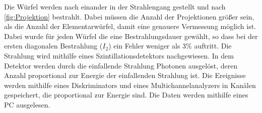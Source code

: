 Die Würfel werden nach einander in der Strahlengang gestellt und nach \cref{fig:Projektion} bestrahlt.
Dabei müssen die Anzahl der Projektionen größer sein, als die Anzahl der Elementarwürfel, damit eine genauere Vermessung möglich ist.\\
Dabei wurde für jeden Würfel die eine Bestrahlungsdauer gewählt, so dass bei der ersten diagonalen Bestrahlung ($I_2$) ein Fehler weniger als $3\%$ auftritt.
Die Strahlung wird mithilfe eines Szintillationsdetektors nachgewiesen.
In dem Detektor werden durch die einfallende Strahlung Photonen ausgelöst, deren Anzahl proportional zur Energie der einfallenden Strahlung ist.
Die Ereignisse werden mithilfe eines Diskriminators und eines Multichannelanalyzers in Kanälen gespeichert, die proportional zur Energie sind.
Die Daten werden mithilfe eines PC ausgelesen.